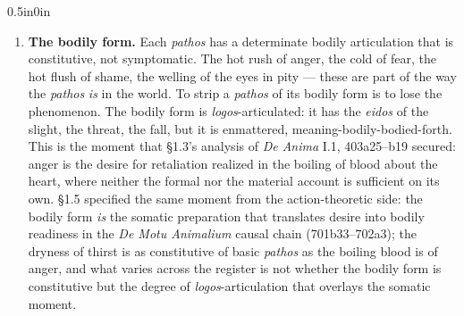 \documentclass{article}
\begin{document}
\begin{adjustwidth}{0.5in}{0in}
\begin{enumerate}
        \item \textbf{The bodily form.} Each \textit{pathos} has a determinate bodily articulation that is constitutive, not symptomatic. The hot rush of anger, the cold of fear, the hot flush of shame, the welling of the eyes in pity --- these are part of the way the \textit{pathos} \textit{is} in the world. To strip a \textit{pathos} of its bodily form is to lose the phenomenon. The bodily form is \textit{logos}-articulated: it has the \textit{eidos} of the slight, the threat, the fall, but it is enmattered, meaning-bodily-bodied-forth. This is the moment that \S1.3's analysis of \textit{De Anima} I.1, 403a25--b19 secured: anger is the desire for retaliation realized in the boiling of blood about the heart, where neither the formal nor the material account is sufficient on its own. \S1.5 specified the same moment from the action-theoretic side: the bodily form \textit{is} the somatic preparation that translates desire into bodily readiness in the \textit{De Motu Animalium} causal chain (701b33--702a3); the dryness of thirst is as constitutive of basic \textit{pathos} as the boiling blood is of anger, and what varies across the register is not whether the bodily form is constitutive but the degree of \textit{logos}-articulation that overlays the somatic moment.
        

\end{enumerate}
\end{adjustwidth}
\end{document}
